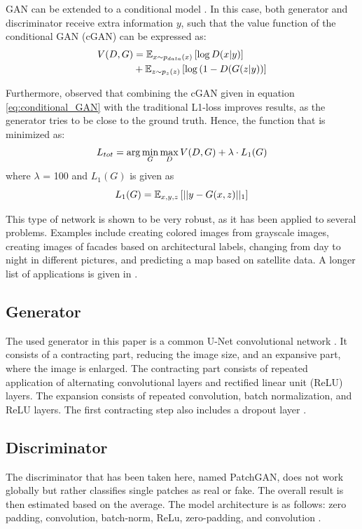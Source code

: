 GAN can be extended to a conditional model \citep{mirza2014conditional}. In this case, both generator and discriminator receive extra information $y$, such that the value function of the conditional GAN (cGAN) can be expressed as:
\begin{equation}
	\centering
	\begin{aligned}
		V(D, G) &= \mathbb{E}_{x \sim p_{data}(x)} \left[ \log D(x|y) \right] \\
		&+ \mathbb{E}_{z \sim p_{z}(z)} \left[ \log \left( 1-D(G(z|y) \right) \right]
	\end{aligned}
	\label{eq:conditional_GAN}
\end{equation}

Furthermore, \cite{isola2017image} observed that combining the cGAN given in equation \ref{eq:conditional_GAN} with the traditional L1-loss improves results, as the generator tries to be close to the ground truth. Hence, the function that is minimized as:
\begin{equation}
	\centering
	L_{tot} = \arg \min_{G} \max_{D} V(D, G) + \lambda \cdot L_1(G)
	\label{eq:total_gen_loss}
\end{equation}
where $\lambda$ = 100 and $L_1(G)$ is given as
\begin{equation}
	\centering
	L_1(G) = \mathbb{E}_{x,y,z} \left[ ||{y - G(x,z)}||_1 \right]
	\label{eq:l1_loss}
\end{equation}

This type of network is shown to be very robust, as it has been applied to several problems. Examples include creating colored images from grayscale images, creating images of facades based on architectural labels, changing from day to night in different pictures, and predicting a map based on satellite data. A longer list of applications is given in \cite{isola2017image}. 


\subsection{Generator}
The used generator in this paper is a common U-Net convolutional network \citep{ronneberger2015u}. It consists of a contracting part, reducing the image size, and an expansive part, where the image is enlarged. The contracting part consists of repeated application of alternating convolutional layers and rectified linear unit (ReLU) layers. The expansion consists of repeated convolution, batch normalization, and ReLU layers. The first contracting step also includes a dropout layer \citep{isola2017image}.

\subsection{Discriminator}
The discriminator that has been taken here, named PatchGAN, does not work globally but rather classifies single patches as real or fake. The overall result is then estimated based on the average. The model architecture is as follows: zero padding, convolution, batch-norm, ReLu, zero-padding, and convolution \citep{isola2017image}.